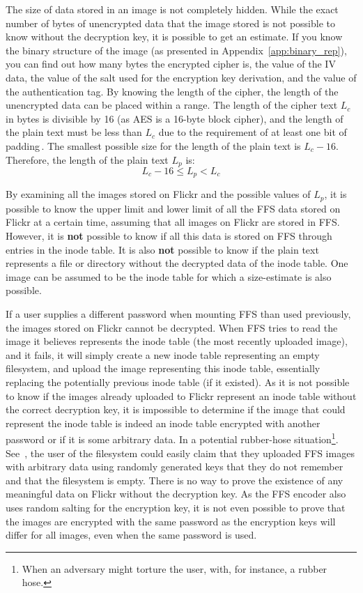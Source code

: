 The size of data stored in an image is not completely hidden. While the exact number of bytes of unencrypted data that the image stored is not possible to know without the decryption key, it is possible to get an estimate. If you know the binary structure of the image (as presented in Appendix~\ref{app:binary_rep}), you can find out how many bytes the encrypted cipher is, the value of the \gls{IV} data, the value of the salt used for the encryption key derivation, and the value of the authentication tag. By knowing the length of the cipher, the length of the unencrypted data can be placed within a range. The length of the cipher text $L_c$ in bytes is divisible by 16 (as \gls{AES} is a \mbox{16-byte} block cipher), and the length of the plain text must be less than $L_c$ due to the requirement of at least one bit of padding\,\cite{z.z.coderAnswerSizeData2010}. The smallest possible size for the length of the plain text is $L_c - 16$. Therefore, the length of the plain text $L_p$ is:
\begin{equation}
    L_c - 16 \leq L_p < L_c
\end{equation}	

By examining all the images stored on Flickr and the possible values of $L_p$, it is possible to know the upper limit and lower limit of all the \gls{FFS} data stored on Flickr at a certain time, assuming that all images on Flickr are stored in \gls{FFS}. However, it is \textbf{not} possible to know if all this data is stored on \gls{FFS} through entries in the inode table. It is also \textbf{not} possible to know if the plain text represents a file or directory without the decrypted data of the inode table. One image can be assumed to be the inode table for which a \mbox{size-estimate} is also possible. 

If a user supplies a different password when mounting \gls{FFS} than used previously, the images stored on Flickr cannot be decrypted. When \gls{FFS} tries to read the image it believes represents the inode table (the most recently uploaded image), and it fails, it will simply create a new inode table representing an empty filesystem, and upload the image representing this inode table, essentially replacing the potentially previous inode table (if it existed). As it is not possible to know if the images already uploaded to Flickr represent an inode table without the correct decryption key, it is impossible to determine if the image that could represent the inode table is indeed an inode table encrypted with another password or if it is some arbitrary data. In a potential \mbox{rubber-hose} situation\footnote{When an adversary might torture the user, with, for instance, a rubber hose.}. See~, the user of the filesystem could easily claim that they uploaded \gls{FFS} images with arbitrary data using randomly generated keys that they do not remember and that the filesystem is empty. There is no way to prove the existence of any meaningful data on Flickr without the decryption key. As the \gls{FFS} encoder also uses random salting for the encryption key, it is not even possible to prove that the images are encrypted with the same password as the encryption keys will differ for all images, even when the same password is used. 


